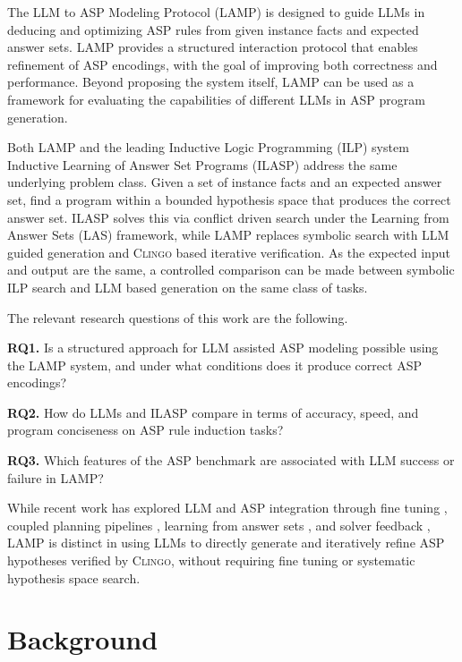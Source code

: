 \documentclass[11pt,a4paper]{article}
\begin{document}
The LLM to ASP Modeling Protocol (LAMP) is designed to guide LLMs in deducing and optimizing ASP rules from given instance facts and expected answer sets. LAMP provides a structured interaction protocol that enables refinement of ASP encodings, with the goal of improving both correctness and performance. Beyond proposing the system itself, LAMP can be used as a framework for evaluating the capabilities of different LLMs in ASP program generation.

Both LAMP and the leading Inductive Logic Programming (ILP) system Inductive Learning of Answer Set Programs (ILASP) \cite{law2020ilaspinductivelearninganswer} address the same underlying problem class. Given a set of instance facts and an expected answer set, find a program within a bounded hypothesis space that produces the correct answer set. ILASP solves this via conflict driven search under the Learning from Answer Sets (LAS) framework, while LAMP replaces symbolic search with LLM guided generation and \textsc{Clingo} based iterative verification. As the expected input and output are the same, a controlled comparison can be made between symbolic ILP search and LLM based generation on the same class of tasks.

The relevant research questions of this work are the following.

\noindent
\textbf{RQ1.} Is a structured approach for LLM assisted ASP modeling possible using the LAMP system, and under what conditions does it produce correct ASP encodings?

\noindent
\textbf{RQ2.} How do LLMs and ILASP compare in terms of accuracy, speed, and program conciseness on ASP rule induction tasks?

\noindent
\textbf{RQ3.} Which features of the ASP benchmark are associated with LLM success or failure in LAMP?

While recent work has explored LLM and ASP integration through fine tuning \cite{coppolillo2024llaspfinetuninglargelanguage}, coupled planning pipelines \cite{lin2024clmaspcouplinglargelanguage}, learning from answer sets \cite{borroto2025questionansweringllmslearning}, and solver feedback \cite{schrader2025solverintheloopframeworkimprovingllms}, LAMP is distinct in using LLMs to directly generate and iteratively refine ASP hypotheses verified by \textsc{Clingo}, without requiring fine tuning or systematic hypothesis space search.

\section{Background}
\end{document}
